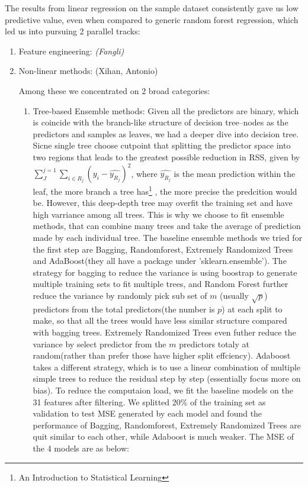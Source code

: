 \documentclass[11pt]{article}
\begin{document}
The results from linear regression on the sample dataset consistently gave us low predictive value, even when compared to generic random forest regression, which led us into pursuing 2 parallel tracks:

\begin{enumerate}

\item Feature engineering: \emph{(Fangli)}

\item Non-linear methods: (Xihan, Antonio)

Among these we concentrated on 2 broad categories:

\begin{enumerate}

\item Tree-based Ensemble methods: Given all the predictors are binary, which is coincide with the branch-like structure of decision tree--nodes as the predictors and samples as leaves, we had a deeper dive into decision tree. Sicne single tree choose cutpoint that splitting the predictor space into two regions that leads to the greatest possible reduction in RSS, given by $\sum_{J}^{j=1}\sum_{i\in R_{j}}(y_{i}-\hat{y_{R_{j}}})^{2}$, where $\hat{y_{R_{j}}}$ is the mean prediction within the leaf, the more branch a tree has\footnote{An Introduction to Statistical Learning} , the more precise the predcition would be. However, this deep-depth tree may overfit the training set and have high varriance among all trees. This is why we choose to fit ensemble methods, that can combine many trees and take the average of prediction made by each individual tree. The baseline ensemble methods we tried for the first step are Bagging, Randomforest, Extremely Randomized Trees and AdaBoost(they all have a package under 'sklearn.ensemble'). The strategy for bagging to reduce the variance is using boostrap to generate multiple training sets to fit multiple trees, and Random Forest further reduce the variance by randomly pick sub set of $\mathit{m}$ (usually $\sqrt{p}$) predictors from the total predictors(the number is $\mathit{p}$) at each split to make, so that all the trees would have less similar structure compared with bagging trees. Extremely Randomized Trees even futher reduce the variance by select predictor from the $\mathit{m}$ predictors totaly at random(rather than prefer those have higher split effciency). Adaboost takes a different strategy, which is to use a linear combination of multiple simple trees to reduce the residual step by step (essentially focus more on bias). To reduce the computaion load, we fit the baseline models on the 31 features after filtering. We splitted 20\% of the training set as validation to test MSE generated by each model and found the performance of Bagging, Randomforest, Extremely Randomized Trees are quit similar to each other, while Adaboost is much weaker. The MSE of the 4 models are as below: 


\end{enumerate}
\end{enumerate}
\end{document}
